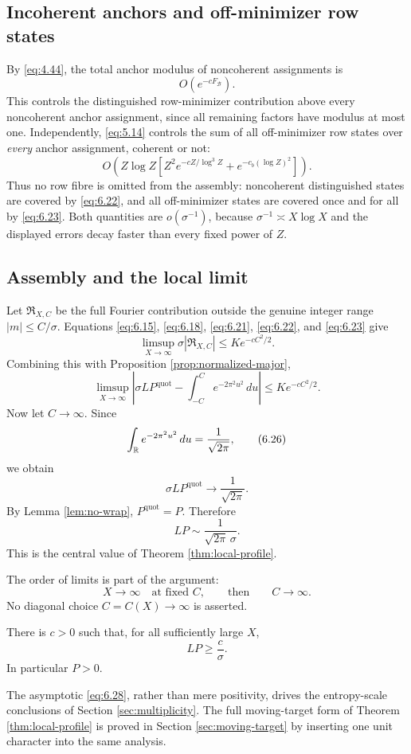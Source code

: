 \subsection{Incoherent anchors and off-minimizer row states}

By \eqref{eq:4.44}, the total anchor modulus of noncoherent assignments is
\[
O(e^{-cF_{\mathcal B}}).
\tag{6.22}\label{eq:6.22}
\]
This controls the distinguished row-minimizer contribution above every noncoherent anchor assignment, since all remaining factors have modulus at most one. Independently, \eqref{eq:5.14} controls the sum of all off-minimizer row states over \emph{every} anchor assignment, coherent or not:
\[
O\!\left(
Z\log Z\left[
Z^2e^{-cZ/\log^3Z}
+e^{-c_b(\log Z)^2}
\right]
\right).
\tag{6.23}\label{eq:6.23}
\]
Thus no row fibre is omitted from the assembly: noncoherent distinguished states are covered by \eqref{eq:6.22}, and all off-minimizer states are covered once and for all by \eqref{eq:6.23}. Both quantities are $o(\sigma^{-1})$, because $\sigma^{-1}\asymp X\log X$ and the displayed errors decay faster than every fixed power of $Z$.

\subsection{Assembly and the local limit}

Let $\mathfrak R_{X,C}$ be the full Fourier contribution outside the genuine integer range $|m|\le C/\sigma$. Equations \eqref{eq:6.15}, \eqref{eq:6.18}, \eqref{eq:6.21}, \eqref{eq:6.22}, and \eqref{eq:6.23} give
\[
\limsup_{X\to\infty}
\sigma|\mathfrak R_{X,C}|
\le
Ke^{-cC^2/2}.
\tag{6.24}\label{eq:6.24}
\]
Combining this with Proposition \ref{prop:normalized-major},
\[
\limsup_{X\to\infty}
\left|
\sigma L P^{\mathrm{quot}}
-
\int_{-C}^{C}e^{-2\pi^2u^2}\,du
\right|
\le
Ke^{-cC^2/2}.
\tag{6.25}\label{eq:6.25}
\]
Now let $C\to\infty$. Since
\[
\int_{\mathbb R}e^{-2\pi^2u^2}\,du
=\frac1{\sqrt{2\pi}},
\tag{6.26}\label{eq:6.26}
\]
we obtain
\[
\sigma L P^{\mathrm{quot}}
\longrightarrow
\frac1{\sqrt{2\pi}}.
\tag{6.27}\label{eq:6.27}
\]
By Lemma \ref{lem:no-wrap}, $P^{\mathrm{quot}}=P$. Therefore
\[
L P
\sim
\frac1{\sqrt{2\pi}\,\sigma}.
\tag{6.28}\label{eq:6.28}
\]
This is the central value of Theorem \ref{thm:local-profile}.

The order of limits is part of the argument:
\[
X\to\infty\quad\text{at fixed }C,
\qquad\text{then}\qquad
C\to\infty.
\tag{6.29}\label{eq:6.29}
\]
No diagonal choice $C=C(X)\to\infty$ is asserted.

\begin{corollary}\label{cor:positive}
There is $c>0$ such that, for all sufficiently large $X$,
\[
LP\ge\frac{c}{\sigma}.
\tag{6.30}\label{eq:6.30}
\]
In particular $P>0$.
\end{corollary}

The asymptotic \eqref{eq:6.28}, rather than mere positivity, drives the entropy-scale conclusions of Section \ref{sec:multiplicity}. The full moving-target form of Theorem \ref{thm:local-profile} is proved in Section \ref{sec:moving-target} by inserting one unit character into the same analysis.